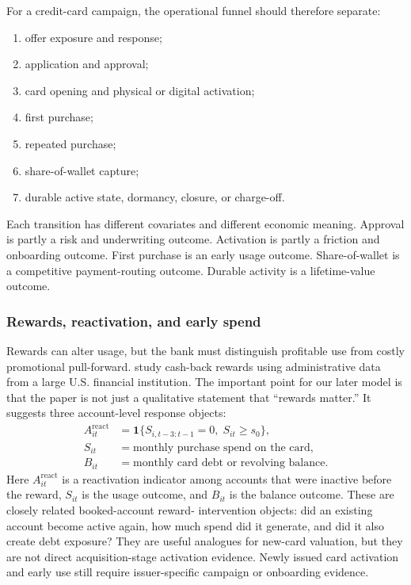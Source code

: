 \documentclass[11pt]{article}
\newcommand{\1}{\mathbf{1}}
\begin{document}
For a credit-card campaign, the operational funnel should therefore separate:
\begin{enumerate}[label=\arabic*.]
  \item offer exposure and response;
  \item application and approval;
  \item card opening and physical or digital activation;
  \item first purchase;
  \item repeated purchase;
  \item share-of-wallet capture;
  \item durable active state, dormancy, closure, or charge-off.
\end{enumerate}
Each transition has different covariates and different economic meaning.
Approval is partly a risk and underwriting outcome. Activation is partly a
friction and onboarding outcome. First purchase is an early usage outcome.
Share-of-wallet is a competitive payment-routing outcome. Durable activity is a
lifetime-value outcome.

\subsubsection{Rewards, reactivation, and early spend}

Rewards can alter usage, but the bank must distinguish profitable use from
costly promotional pull-forward. \citet{agarwal2010rewards} study cash-back
rewards using administrative data from a large U.S. financial institution. The
important point for our later model is that the paper is not just a qualitative
statement that ``rewards matter.'' It suggests three account-level response
objects:
\begin{align}
  A_{it}^{\mathrm{react}}
    &= \1\{S_{i,t-3:t-1}=0,\; S_{it}\geq s_0\}, \label{eq:reward-reactivation}\\
  S_{it}
    &= \text{monthly purchase spend on the card}, \label{eq:reward-spend-outcome}\\
  B_{it}
    &= \text{monthly card debt or revolving balance}. \label{eq:reward-debt-outcome}
\end{align}
Here $A_{it}^{\mathrm{react}}$ is a reactivation indicator among accounts that
were inactive before the reward, $S_{it}$ is the usage outcome, and $B_{it}$ is
the balance outcome. These are closely related booked-account reward-
intervention objects: did an existing account become active again, how much
spend did it generate, and did it also create debt exposure? They are useful
analogues for new-card valuation, but they are not direct acquisition-stage
activation evidence. Newly issued card activation and early use still require
issuer-specific campaign or onboarding evidence.
\end{document}
